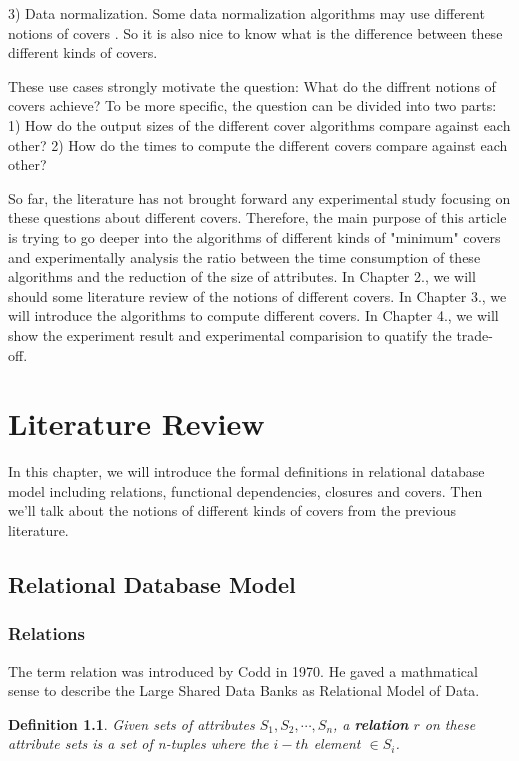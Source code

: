 \documentclass[11pt]{book}
\newtheorem{mydef}[thm]{Definition}
\begin{document}
3) Data normalization. Some data normalization algorithms may use different notions of covers \cite{koehler2006finding,beeri1979computational}. So it is also nice to know what is the difference between these different kinds of covers.

These use cases strongly motivate the question: What do the diffrent notions of covers achieve? To be more specific, the question can be divided into two parts: 1) How do the output sizes of the different cover algorithms compare against each other? 2) How do the times to compute the different covers compare against each other?

So far, the literature has not brought forward any experimental study focusing on these questions about different covers. Therefore, the main purpose of this article is trying to go deeper into the algorithms of different kinds of "minimum" covers and experimentally analysis the ratio between the time consumption of these algorithms and the reduction of the size of attributes. In Chapter 2., we will should some literature review of the notions of different covers. In Chapter 3., we will introduce the algorithms to compute different covers. In Chapter 4., we will show the experiment result and experimental comparision to quatify the trade-off.

\chapter{Literature Review}

In this chapter, we will introduce the formal definitions in relational database model including relations, functional dependencies, closures and covers. Then we'll talk about the notions of different kinds of covers from the previous literature.

\section{Relational Database Model}

\subsection{Relations}

The term relation was introduced by Codd \cite{codd13f} in 1970. He gaved a mathmatical sense to describe the Large Shared Data Banks as Relational Model of Data. 

\begin{mydef}
Given sets of attributes $S_1, S_2, \cdots, S_n$, a \textbf{relation} $r$ on these attribute sets is a set of n-tuples where the $i-th$ element $\in S_i$.
\end{mydef}
\end{document}
